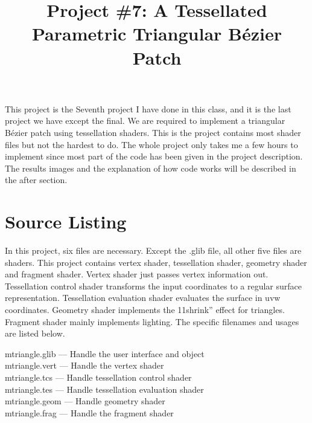 \documentclass[letterpaper,14pt,titlepage,fleqn]{article}
\author{\name}
\title{Project \#7: A Tessellated Parametric Triangular B\'{e}zier Patch}
\begin{document}
\maketitle

This project is the Seventh project I have done in this class, and it is the last project we have except the final. We are required to implement a triangular B\'{e}zier patch using tessellation shaders. This is the project contains most shader files but not the hardest to do. The whole project only takes me a few hours to implement since most part of the code has been given in the project description. The results images and the explanation of how code works will be described in the after section. 

\section{Source Listing}
In this project, six files are necessary. Except the .glib file, all other five files are shaders. This project contains vertex shader, tessellation shader, geometry shader and fragment shader. Vertex shader just passes vertex information out. Tessellation control shader transforms the input coordinates to a regular surface representation. Tessellation evaluation shader evaluates the surface in uvw coordinates. Geometry shader implements the 11shrink'' effect for triangles. Fragment shader mainly implements lighting. The specific filenames and usages are listed below.

mtriangle.glib --- Handle the user interface and object\\
mtriangle.vert --- Handle the vertex shader\\
mtriangle.tcs --- Handle tessellation control shader\\
mtriangle.tes --- Handle tessellation evaluation shader\\
mtriangle.geom --- Handle geometry shader\\
mtriangle.frag --- Handle the fragment shader\\
\end{document}
